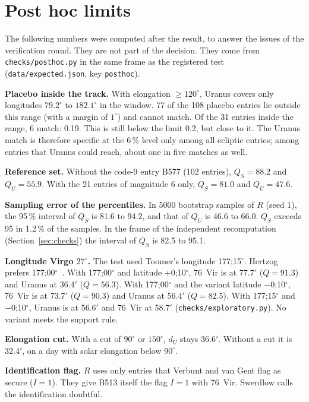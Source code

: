 \documentclass[11pt]{article}
\newcommand{\am}{$'$}
\begin{document}
\section{Post hoc limits}\label{sec:posthoc}
The following numbers were computed after the result, to answer the issues of the verification round. They are not part of the decision. They come from \texttt{checks/posthoc.py} in the same frame as the registered test (\texttt{data/expected.json}, key \texttt{posthoc}).

\textbf{Placebo inside the track.} With elongation $\ge120^\circ$, Uranus covers only longitudes $79.2^\circ$ to $182.1^\circ$ in the window. 77 of the 108 placebo entries lie outside this range (with a margin of $1^\circ$) and cannot match. Of the 31 entries inside the range, 6 match: 0.19. This is still below the limit 0.2, but close to it. The Uranus match is therefore specific at the 6\,\% level only among all ecliptic entries; among entries that Uranus could reach, about one in five matches as well.

\textbf{Reference set.} Without the code-9 entry B577 (102 entries), $Q_S=88.2$ and $Q_U=55.9$. With the 21 entries of magnitude 6 only, $Q_S=81.0$ and $Q_U=47.6$.

\textbf{Sampling error of the percentiles.} In 5000 bootstrap samples of $R$ (seed 1), the 95\,\% interval of $Q_S$ is 81.6 to 94.2, and that of $Q_U$ is 46.6 to 66.0. $Q_S$ exceeds 95 in 1.2\,\% of the samples. In the frame of the independent recomputation (Section~\ref{sec:checks}) the interval of $Q_S$ is 82.5 to 95.1.

\textbf{Longitude Virgo $27^\circ$.} The test used Toomer's longitude 177;15$^\circ$. Hertzog prefers 177;00$^\circ$~\cite[n.~4]{swerdlow2020}. With 177;00$^\circ$ and latitude $+0$;10$^\circ$, 76~Vir is at 77.7\am{} ($Q=91.3$) and Uranus at 36.4\am{} ($Q=56.3$). With 177;00$^\circ$ and the variant latitude $-0$;10$^\circ$, 76~Vir is at 73.7\am{} ($Q=90.3$) and Uranus at 56.4\am{} ($Q=82.5$). With 177;15$^\circ$ and $-0$;10$^\circ$, Uranus is at 56.6\am{} and 76~Vir at 58.7\am{} (\texttt{checks/exploratory.py}). No variant meets the support rule.

\textbf{Elongation cut.} With a cut of $90^\circ$ or $150^\circ$, $d_U$ stays 36.6\am. Without a cut it is 32.4\am, on a day with solar elongation below $90^\circ$.

\textbf{Identification flag.} $R$ uses only entries that Verbunt and van Gent flag as secure ($I=1$). They give B513 itself the flag $I=1$ with 76~Vir. Swerdlow calls the identification doubtful.
\end{document}
